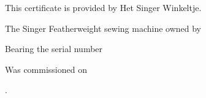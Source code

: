 \documentclass[a4paper]{article}
\begin{document}

\pagecolor{bg}

\begin{center}
\end{center}

\vspace{1cm}

\begin{center}
\end{center}


\def\setverb{\def\do##1{\catcode`##1=12}\dospecials }
\def\verbinput#1{\bgroup \setverb \unskip\egroup}

\begin{center}

\vspace{1cm}

This certificate is provided by Het Singer Winkeltje.

\vspace{2cm}

The Singer Featherweight sewing machine owned by

\vspace{0.3cm}%
{\Large \verbinput{name.txt}}%
\vspace{1cm}

Bearing the serial number

\vspace{0.3cm}%
{\Large \verbinput{serial.txt}}%
\vspace{1cm}

Was commissioned on

\vspace{0.3cm}%
{\Large \verbinput{date.txt}}.%
\vspace{1cm}

\end{center}
\end{document}

